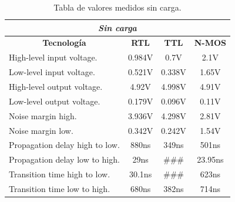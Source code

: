 \begin{table}[H]
\center

\begin{tabular}{|l|c|c|c|}
\hline
\multicolumn{4}{|c|}{\textit{\textbf{Sin carga}}}                                                             \\ \hline
\multicolumn{1}{|c|}{\textbf{Tecnolog\'ia}} & \textbf{RTL} & \textbf{TTL} & \multicolumn{1}{l|}{\textbf{N-MOS}} \\ \hline
High-level input voltage.                 & 0.984V       & 0.7V         & 2.1V                                \\ \hline
Low-level input voltage.                  & 0.521V       & 0.338V       & 1.65V                               \\ \hline
High-level output voltage.                & 4.92V        & 4.998V       & 4.91V                                \\ \hline
Low-level output voltage.                 & 0.179V       & 0.096V       & 0.11V                               \\ \hline
Noise margin high.                        & 3.936V       & 4.298V       & 2.81V                               \\ \hline
Noise margin low.                         & 0.342V       & 0.242V       & 1.54V                               \\ \hline
Propagation delay high to low.            & 880ns        & 349ns        & 501ns                              \\ \hline
Propagation delay low to high.            & 29ns         & \#\#\#       & 23.95ns                              \\ \hline
Transition time high to low.              & 30.1ns       & \#\#\#         & 623ns                               \\ \hline
Transition time low to high.              & 680ns        & 382ns        & 714ns                                \\ \hline
\end{tabular}
\caption{Tabla de valores medidos sin carga.}
\label{tab:ej1_sin_carga}
\end{table}


